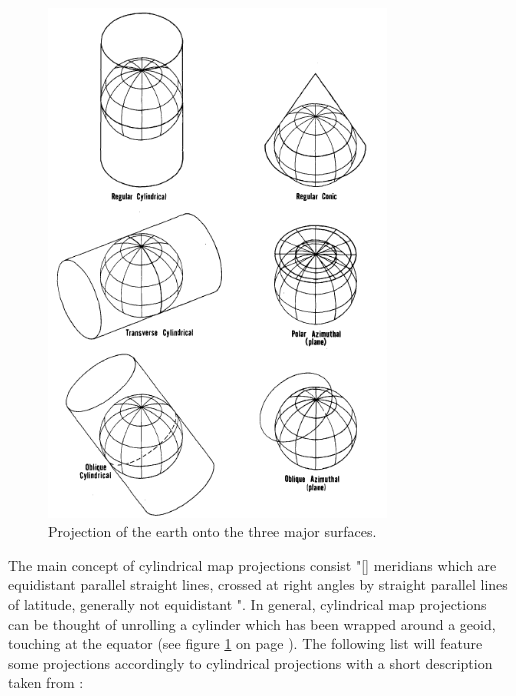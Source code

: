 \begin{figure}[!htb]
\centering
\includegraphics[width=0.8\textwidth,keepaspectratio]{images/methods/mappings.png}
\caption[
    Projection of the earth onto the three major surfaces .
]{Projection of the earth onto the three major surfaces.}
\label{fig:projections-base}
\end{figure}

The main concept of cylindrical map projections consist "[\ldotsof] meridians which are equidistant parallel straight lines, crossed at right angles by straight parallel lines of latitude, generally not equidistant ".
In general, cylindrical map projections can be thought of unrolling a cylinder which has been wrapped around a geoid, touching at the equator (see figure \ref{fig:projections-base} on page \pageref{fig:projections-base}). The following list will feature some projections accordingly to cylindrical projections with a short description taken from \citeauthor{Synder1987} :

